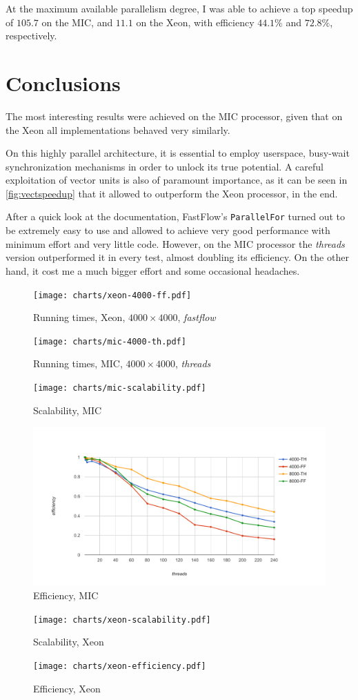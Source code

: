 \documentclass[a4paper,11pt]{article}
\newcommand{\code}[1]{\texttt{#1}}
\begin{document}
At the maximum available parallelism degree, I was able to achieve a top speedup of $105.7$ on the MIC, and $11.1$ on the Xeon, with efficiency $44.1\%$ and $72.8\%$, respectively.

\section{Conclusions}

The most interesting results were achieved on the MIC processor, given that on the Xeon all implementations behaved very similarly.

On this highly parallel architecture, it is essential to employ userspace, busy-wait synchronization mechanisms in order to unlock its true potential. A careful exploitation of vector units is also of paramount importance, as it can be seen in \autoref{fig:vectspeedup} that it allowed to outperform the Xeon processor, in the end.

After a quick look at the documentation, FastFlow's \code{ParallelFor} turned out to be extremely easy to use and allowed to achieve very good performance with minimum effort and very little code. However, on the MIC processor the \emph{threads} version outperformed it in every test, almost doubling its efficiency. On the other hand, it cost me a much bigger effort and some occasional headaches.

\begin{figure}[p] \centering
\texttt{[image: charts/xeon-4000-ff.pdf]}
\caption{Running times, Xeon, $4000\times4000$, \emph{fastflow}}
\end{figure}

\begin{figure}[pb] \centering
\texttt{[image: charts/mic-4000-th.pdf]}
\caption{Running times, MIC, $4000\times4000$, \emph{threads}}
\end{figure}

\begin{figure}[p] \centering
\texttt{[image: charts/mic-scalability.pdf]}
\caption{Scalability, MIC}
\end{figure}

\begin{figure}[p] \centering
\includegraphics[width=\textwidth]{charts/mic-efficiency.pdf}
\caption{Efficiency, MIC}
\end{figure}

\begin{figure}[p] \centering
\texttt{[image: charts/xeon-scalability.pdf]}
\caption{Scalability, Xeon}
\end{figure}

\begin{figure}[p] \centering
\texttt{[image: charts/xeon-efficiency.pdf]}
\caption{Efficiency, Xeon}
\end{figure}
\end{document}
